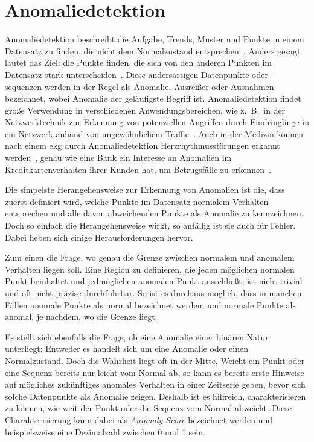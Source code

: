  \chapter{Anomaliedetektion}\label{ch:anomalien}
Anomaliedetektion beschreibt die Aufgabe, Trends, Muster und Punkte in einem Datensatz zu finden, die nicht dem Normalzustand
entsprechen~\cite{Chandola2009}. Anders gesagt lautet das Ziel: die Punkte finden, die sich von den anderen Punkten im Datensatz
stark unterscheiden~\cite[Kap.~10]{Tan2014}. Diese andersartigen Datenpunkte oder -sequenzen werden in der Regel als Anomalie,
Ausreißer oder Ausnahmen bezeichnet, wobei Anomalie der geläufigste Begriff ist. Anomaliedetektion findet große Verwendung in
verschiedenen Anwendungsbereichen, wie z.~B.~in der Netzwerktechnik zur Erkennung von potenziellen Angriffen durch Eindringlinge
in ein Netzwerk anhand von ungewöhnlichem Traffic~\Cite{Bernacki2015}. Auch in der Medizin können nach einem \ac{ekg}
durch Anomaliedetektion Herzrhythmusstörungen erkannt werden~\cite{Chuah2007}, genau wie eine Bank ein Interesse
an Anomalien im Kreditkartenverhalten ihrer Kunden hat, um Betrugsfälle zu erkennen~\cite{Jiang2023, CeronmaniSharmila2019}.

Die simpelste Herangehensweise zur Erkennung von Anomalien ist die, dass zuerst definiert wird, welche Punkte im Datensatz normalem
Verhalten entsprechen und alle davon abweichenden Punkte als Anomalie zu kennzeichnen. Doch so einfach die Herangehensweise wirkt,
so anfällig ist sie auch für Fehler. Dabei heben sich einige Herausforderungen hervor.

Zum einen die Frage, wo genau die Grenze zwischen normalem und anomalem Verhalten liegen soll. Eine Region zu definieren, die jeden 
möglichen normalen Punkt beinhaltet und jedmöglichen anomalen Punkt ausschließt, ist nicht trivial und oft nicht präzise durchführbar.
So ist es durchaus möglich, dass in manchen Fällen anomale Punkte als normal bezeichnet werden, und normale Punkte als anomal, je
nachdem, wo die Grenze liegt.

Es stellt sich ebenfalls die Frage, ob eine Anomalie einer binären Natur unterliegt: Entweder es handelt sich um eine Anomalie oder
einen Normalzustand. Doch die Wahrheit liegt oft in der Mitte. Weicht ein Punkt oder eine Sequenz bereits nur leicht vom Normal ab,
so kann es bereits erste Hinweise auf mögliches zukünftiges anomales Verhalten in einer Zeitserie geben, bevor sich solche Datenpunkte
als Anomalie zeigen. Deshalb ist es hilfreich, charakterisieren zu können, wie weit der Punkt oder die Sequenz
vom Normal abweicht. Diese Charakterisierung kann dabei als \textit{Anomaly Score} bezeichnet werden und beispielsweise eine Dezimalzahl
zwischen 0 und 1 sein.

